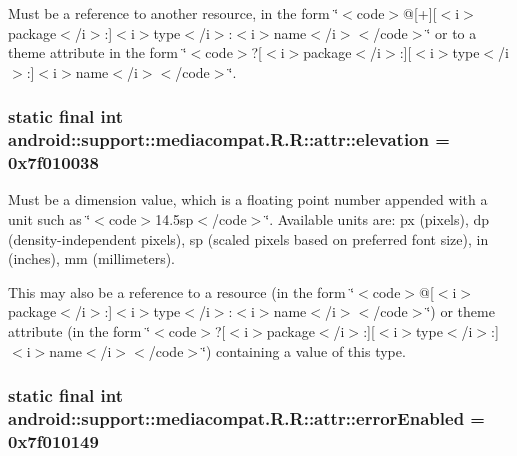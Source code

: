 Must be a reference to another resource, in the form \char`\"{}$<$code$>$@\mbox{[}+\mbox{]}\mbox{[}$<$i$>$package$<$/i$>$:\mbox{]}$<$i$>$type$<$/i$>$:$<$i$>$name$<$/i$>$$<$/code$>$\char`\"{} or to a theme attribute in the form \char`\"{}$<$code$>$?\mbox{[}$<$i$>$package$<$/i$>$:\mbox{]}\mbox{[}$<$i$>$type$<$/i$>$:\mbox{]}$<$i$>$name$<$/i$>$$<$/code$>$\char`\"{}. \hypertarget{classandroid_1_1support_1_1mediacompat_1_1_r_1_1attr_873649a1ed4fceb7d6a140f40280b4de}{
\subsubsection[{elevation}]{\setlength{\rightskip}{0pt plus 5cm}static final int android::support::mediacompat.R.R::attr::elevation = 0x7f010038}}
\label{classandroid_1_1support_1_1mediacompat_1_1_r_1_1attr_873649a1ed4fceb7d6a140f40280b4de}


Must be a dimension value, which is a floating point number appended with a unit such as \char`\"{}$<$code$>$14.5sp$<$/code$>$\char`\"{}. Available units are: px (pixels), dp (density-independent pixels), sp (scaled pixels based on preferred font size), in (inches), mm (millimeters). 

This may also be a reference to a resource (in the form \char`\"{}$<$code$>$@\mbox{[}$<$i$>$package$<$/i$>$:\mbox{]}$<$i$>$type$<$/i$>$:$<$i$>$name$<$/i$>$$<$/code$>$\char`\"{}) or theme attribute (in the form \char`\"{}$<$code$>$?\mbox{[}$<$i$>$package$<$/i$>$:\mbox{]}\mbox{[}$<$i$>$type$<$/i$>$:\mbox{]}$<$i$>$name$<$/i$>$$<$/code$>$\char`\"{}) containing a value of this type. \hypertarget{classandroid_1_1support_1_1mediacompat_1_1_r_1_1attr_44b10f398ae724be760165dfba834ee9}{
\subsubsection[{errorEnabled}]{\setlength{\rightskip}{0pt plus 5cm}static final int android::support::mediacompat.R.R::attr::errorEnabled = 0x7f010149}}
\label{classandroid_1_1support_1_1mediacompat_1_1_r_1_1attr_44b10f398ae724be760165dfba834ee9}


